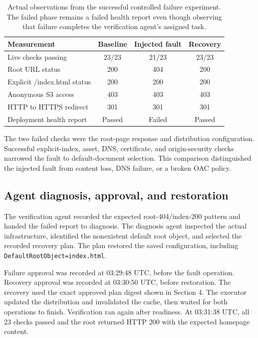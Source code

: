 \documentclass[11pt]{article}
\begin{document}
\begin{table}[htbp]
\centering
\small
\begin{tabular}{@{}lccc@{}}
\toprule
\textbf{Measurement} & \textbf{Baseline} & \textbf{Injected fault} & \textbf{Recovery} \\
\midrule
Live checks passing & 23/23 & 21/23 & 23/23 \\
Root URL status & 200 & 404 & 200 \\
Explicit /index.html status & 200 & 200 & 200 \\
Anonymous S3 access & 403 & 403 & 403 \\
HTTP to HTTPS redirect & 301 & 301 & 301 \\
Deployment health report & Passed & Failed & Passed \\
\bottomrule
\end{tabular}
\caption{Actual observations from the successful controlled failure experiment. The failed phase remains a failed health report even though observing that failure completes the verification agent's assigned task.}
\label{tab:experiment}
\end{table}

The two failed checks were the root-page response and distribution configuration. Successful explicit-index, asset, DNS, certificate, and origin-security checks narrowed the fault to default-document selection. This comparison distinguished the injected fault from content loss, DNS failure, or a broken OAC policy.

\subsection{Agent diagnosis, approval, and restoration}
The verification agent recorded the expected root-404/index-200 pattern and handed the failed report to diagnosis. The diagnosis agent inspected the actual infrastructure, identified the nonexistent default root object, and selected the recorded recovery plan. The plan restored the saved configuration, including \texttt{DefaultRootObject=index.html}.

Failure approval was recorded at 03:29:48 UTC, before the fault operation. Recovery approval was recorded at 03:30:50 UTC, before restoration. The recovery used the exact approved plan digest shown in Section 4. The executor updated the distribution and invalidated the cache, then waited for both operations to finish. Verification ran again after readiness. At 03:31:38 UTC, all 23 checks passed and the root returned HTTP 200 with the expected homepage content.
\end{document}
